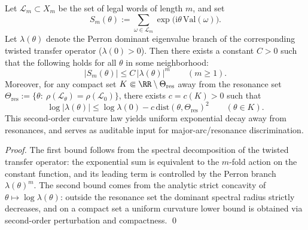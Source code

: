 \begin{proposition}\label{prop:conclusion65-expsums-uniform-ldp}
Let \(\mathcal{L}_m\subset X_m\) be the set of legal words of length \(m\), and set
\[
S_m(\theta):=\sum_{\omega\in\mathcal{L}_m}\exp\!\bigl(\mathrm{i}\theta\,\mathrm{Val}(\omega)\bigr).
\]
Let \(\lambda(\theta)\) denote the Perron dominant eigenvalue branch of the corresponding twisted transfer operator (\(\lambda(0)>0\)).
Then there exists a constant \(C>0\) such that the following holds for all \(\theta\) in some neighborhood:
\[
\boxed{\;
|S_m(\theta)|\le C\,|\lambda(\theta)|^{m}\qquad(m\ge 1).\;}
\]
Moreover, for any compact set \(K\Subset \RR\setminus\Theta_{\mathrm{res}}\) away from the resonance set
\(
\Theta_{\mathrm{res}}:=\{\theta:\ \rho(\mathcal{L}_{\theta})=\rho(\mathcal{L}_0)\}
\),
there exists \(c=c(K)>0\) such that
\[
\boxed{\;
\log|\lambda(\theta)|
\le \log\lambda(0)-c\,\mathrm{dist}(\theta,\Theta_{\mathrm{res}})^{2}
\qquad(\theta\in K).\;}
\]
This second-order curvature law yields uniform exponential decay away from resonances, and serves as auditable input for major-arc/resonance discrimination.
\end{proposition}

\begin{proof}
The first bound follows from the spectral decomposition of the twisted transfer operator: the exponential sum is equivalent to the \(m\)-fold action on the constant function, and its leading term is controlled by the Perron branch \(\lambda(\theta)^{m}\).
The second bound comes from the analytic strict concavity of \(\theta\mapsto \log\lambda(\theta)\): outside the resonance set the dominant spectral radius strictly decreases, and on a compact set a uniform curvature lower bound is obtained via second-order perturbation and compactness. \qed
\end{proof}

\endinput
